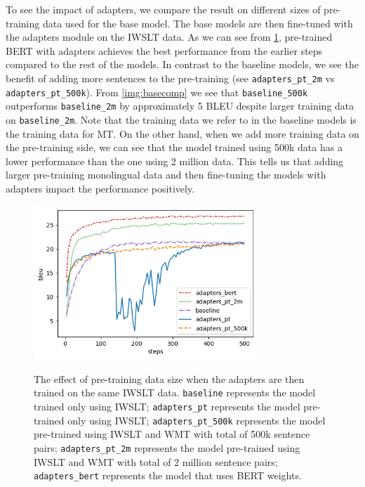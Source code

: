 To see the impact of adapters, we compare the result on different sizes of pre-training data used for the base model. The base models are then fine-tuned with the adapters module on the IWSLT data. As we can see from \cref{img:adpcomp}, pre-trained BERT with adapters achieves the best performance from the earlier steps compared to the rest of the models. In contrast to the baseline models, we see the benefit of adding more sentences to the pre-training (see \texttt{adapters\_pt\_2m} vs \texttt{adapters\_pt\_500k}). From \cref{img:basecomp} we see that \texttt{baseline\_500k} outperforms \texttt{baseline\_2m} by approximately 5 BLEU despite larger training data on \texttt{baseline\_2m}. Note that the training data we refer to in the baseline models is the training data for MT. On the other hand, when we add more training data on the pre-training side, we can see that the model trained using 500k data has a lower performance than the one using 2 million data. This tells us that adding larger pre-training monolingual data and then fine-tuning the models with adapters impact the performance positively.

\begin{figure}[h]
    {\includegraphics[width=0.75\textwidth]{img/adapterscomparison.png}}
    \centering
    \caption[The effect of pre-training data size when the adapters are then trained on the same IWSLT data.]{
        The effect of pre-training data size when the adapters are then trained on the same IWSLT data. \texttt{baseline} represents the model trained only using IWSLT; \texttt{adapters\_pt} represents the model pre-trained only using IWSLT; \texttt{adapters\_pt\_500k} represents the model pre-trained using IWSLT and WMT with total of 500k sentence pairs; \texttt{adapters\_pt\_2m} represents the model pre-trained using IWSLT and WMT with total of 2 million sentence pairs; \texttt{adapters\_bert} represents the model that uses BERT weights.}
    \label{img:adpcomp}
\end{figure}

